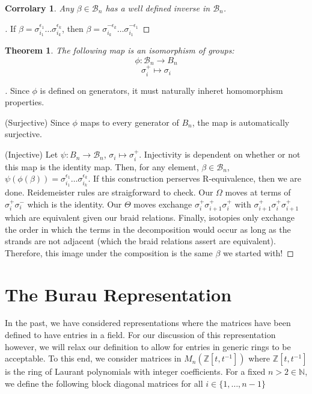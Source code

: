 \documentclass[10pt]{ucthesis}
\newcommand{\Z}{\mathbb{Z}}
\newcommand{\N}{\mathbb{N}}
\newtheorem{theorem}[definition]{Theorem}
\newtheorem{corrolary}[definition]{Corrolary}
\begin{document}
\begin{corrolary}
	Any $\beta\in\mathcal{B}_n$ has a well defined inverse in $\mathcal{B}_n$.
\end{corrolary}

\noindent\begin{proof}[\cite{Kassel}] If $\beta = \sigma^{\epsilon_1}_{i_1}\hdots\sigma^{\epsilon_k}_{i_k}$, then $\beta = \sigma^{-\epsilon_k}_{i_k}\hdots\sigma^{-\epsilon_1}_{i_1}$ \end{proof} 

\begin{theorem}
	The following map is an isomorphism of groups:
$$\phi:\mathcal{B}_n\rightarrow B_n$$
$$\sigma_i^+ \mapsto \sigma_i$$
\end{theorem}

\noindent\begin{proof}[\cite{Kassel}] Since $\phi$ is defined on generators, it must naturally inheret homomorphism properties. 

(Surjective) Since $\phi$ maps to every generator of $B_n$, the map is automatically surjective.

(Injective) Let $\psi:B_n\rightarrow\mathcal{B}_n$, $\sigma_i\mapsto\sigma_i^+$. Injectivity is dependent on whether or not this map is the identity map. Then, for any element, $\beta\in\mathcal{B}_n$, $\psi(\phi(\beta)) = \sigma^{\epsilon_1}_{i_1}\hdots\sigma^{\epsilon_k}_{i_k}$. If this construction perserves R-equivalence, then we are done. Reidemeister rules are straigforward to check. Our $\Omega$ moves at terms of $\sigma_i^+\sigma_i^-$ which is the identity. Our $\Theta$ moves exchange $\sigma_i^+\sigma_{i+1}^+\sigma_i^+$ with $\sigma_{i+1}^+\sigma_i^+\sigma_{i+1}^+$ which are equivalent given our braid relations. Finally, isotopies only exchange the order in which the terms in the decomposition would occur as long as the strands are not adjacent (which the braid relations assert are equivalent). Therefore, this image under the composition is the same $\beta$ we started with! \end{proof} 

\section{The Burau Representation}


In the past, we have considered representations where the matrices have been defined to have entries in a field. For our discussion of this representation however, we will relax our definition to allow for entries in generic rings to be acceptable. To this end, we consider matrices in $M_n(\Z[t,t^{-1}])$ where $\Z[t,t^{-1}]$ is the ring of Laurant polynomials with integer coefficients. For a fixed $n>2\in\N$, we define the following block diagonal matrices for all $i\in \{1,\hdots,n-1\}$
\end{document}

